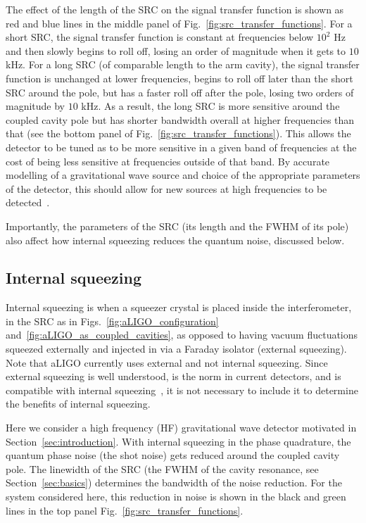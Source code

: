 \documentclass[aps,pra,superscriptaddress,reprint,nofootinbib]{revtex4-1}
\begin{document}
The effect of the length of the SRC on the signal transfer function is shown as red and blue lines in the middle panel of Fig.~\ref{fig:src_transfer_functions}.
For a short SRC, the signal transfer function is constant at frequencies below $10^2$ Hz and then slowly begins to roll off, losing an order of magnitude when it gets to $10$ kHz. For a long SRC (of comparable length to the arm cavity), the signal transfer function is unchanged at lower frequencies, begins to roll off later than the short SRC around the pole, but has a faster roll off after the pole, losing two orders of magnitude by $10$ kHz. As a result, the long SRC is more sensitive around the coupled cavity pole but has shorter bandwidth overall at higher frequencies than that (see the bottom panel of Fig.~\ref{fig:src_transfer_functions}). This allows the detector to be tuned as to be more sensitive in a given band of frequencies at the cost of being less sensitive at frequencies outside of that band. By accurate modelling of a gravitational wave source and choice of the appropriate parameters of the detector, this should allow for new sources at high frequencies to be detected~\cite{Adya_2020}.


Importantly, the parameters of the SRC (its length and the FWHM of its pole) also affect how internal squeezing reduces the quantum noise, discussed below.

\subsection{Internal squeezing}
\label{sec:internal_squeezing}

Internal squeezing is when a squeezer crystal is placed inside the interferometer, in the SRC as in Figs.~\ref{fig:aLIGO_configuration} and~\ref{fig:aLIGO_as_coupled_cavities}, as opposed to having vacuum fluctuations squeezed externally and injected in via a Faraday isolator (external squeezing). Note that aLIGO currently uses external and not internal squeezing. Since external squeezing is well understood, is the norm in current detectors, and is compatible with internal squeezing~\cite{Adya_2020,Korobko_2019}, it is not necessary to include it to determine the benefits of internal squeezing.


Here we consider a high frequency (HF) gravitational wave detector motivated in Section~\ref{sec:introduction}. With internal squeezing in the phase quadrature, the quantum phase noise (the shot noise) gets reduced around the coupled cavity pole. The linewidth of the SRC (the FWHM of the cavity resonance, see Section~\ref{sec:basics}) determines the bandwidth of the noise reduction. For the system considered here, this reduction in noise is shown in the black and green lines in the top panel Fig.~\ref{fig:src_transfer_functions}.
\end{document}
